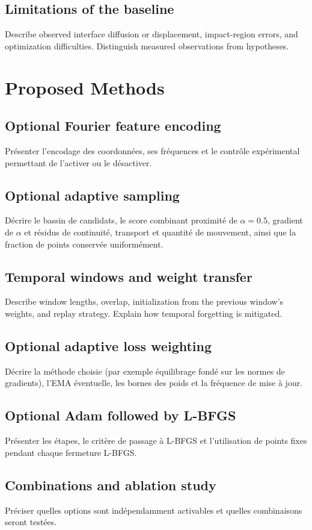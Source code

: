 \documentclass[11pt,a4paper]{article}
\begin{document}
\subsection{Limitations of the baseline}
Describe observed interface diffusion or displacement, impact-region errors, and optimization difficulties. Distinguish measured observations from hypotheses.

\section{Proposed Methods}
\subsection{Optional Fourier feature encoding}
Présenter l'encodage des coordonnées, ses fréquences et le contrôle expérimental permettant de l'activer ou le désactiver.
\subsection{Optional adaptive sampling}
Décrire le bassin de candidats, le score combinant proximité de $\alpha=0.5$, gradient de $\alpha$ et résidus de continuité, transport et quantité de mouvement, ainsi que la fraction de points conservée uniformément.
\subsection{Temporal windows and weight transfer}
Describe window lengths, overlap, initialization from the previous window's weights, and replay strategy. Explain how temporal forgetting is mitigated.
\subsection{Optional adaptive loss weighting}
Décrire la méthode choisie (par exemple équilibrage fondé sur les normes de gradients), l'EMA éventuelle, les bornes des poids et la fréquence de mise à jour.
\subsection{Optional Adam followed by L-BFGS}
Présenter les étapes, le critère de passage à L-BFGS et l'utilisation de points fixes pendant chaque fermeture L-BFGS.
\subsection{Combinations and ablation study}
Préciser quelles options sont indépendamment activables et quelles combinaisons seront testées.
\end{document}
